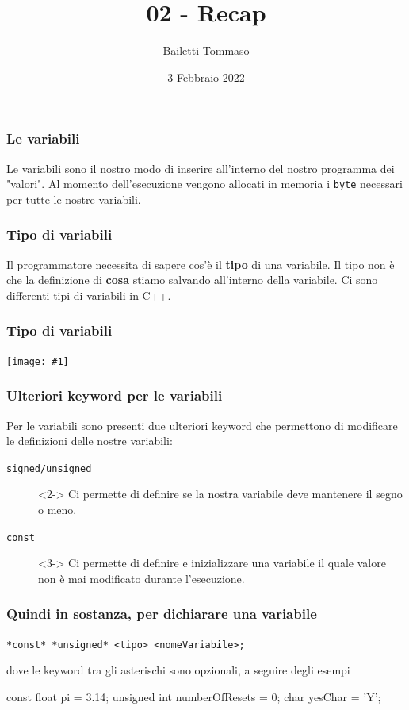 \documentclass{beamer}
\title{02 - Recap}
\author{Bailetti Tommaso}
\institute{ITI Don Orione}
\date{3 Febbraio 2022}
\newcommand{\scaledimage}[1]{\texttt{[image: \#1]}}
\begin{document}
    \begin{frame}
        \titlepage
    \end{frame}

    \begin{frame}
        \frametitle{Le variabili}
        Le variabili sono il nostro modo di inserire all'interno del nostro programma dei "valori". Al momento dell'esecuzione vengono allocati in memoria i \texttt{byte} necessari per tutte le nostre variabili.
    \end{frame}
    
    \begin{frame}
        \frametitle{Tipo di variabili}
        Il programmatore necessita di sapere cos'è il \textbf{tipo} di una variabile. Il tipo non è che la definizione di \textbf{cosa} stiamo salvando all'interno della variabile. Ci sono differenti tipi di variabili in C++.
    \end{frame}
    
    \begin{frame}
        \frametitle{Tipo di variabili}
        \begin{center}
            \scaledimage{img/types.png}
        \end{center}
    \end{frame}

    \begin{frame}
        \frametitle{Ulteriori keyword per le variabili}
        Per le variabili sono presenti due ulteriori keyword che permettono di modificare le definizioni delle nostre variabili:
        \begin{description}
            \item[\texttt{signed/unsigned}]<2-> Ci permette di definire se la nostra variabile deve mantenere il segno o meno.
            \item[\texttt{const}]<3-> Ci permette di definire e inizializzare una variabile il quale valore non è mai modificato durante l'esecuzione. 
        \end{description}
    \end{frame}

    \begin{frame}[fragile]
        \frametitle{Quindi in sostanza, per dichiarare una variabile}
        \begin{center}
            \Large{\texttt{*const* *unsigned* <tipo> <nomeVariabile>;}}
        \end{center}
        dove le keyword tra gli asterischi sono opzionali, a seguire degli esempi
        \begin{center}
            \begin{cppcode}
                const float pi = 3.14;
                unsigned int numberOfResets = 0;
                char yesChar = 'Y';
            \end{cppcode}
        \end{center}
    \end{frame}
\end{document}
